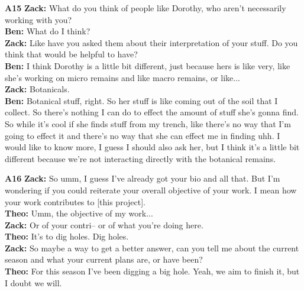 \documentclass{article}
\begin{document}
\noindent\textbf{A15}\label{sec-A15}\newline
\textbf{Zack:} What do you think of people like Dorothy, who aren't
necessarily working with you?\\
\textbf{Ben:} What do I think?\\
\textbf{Zack:} Like have you asked them about their interpretation of
your stuff. Do you think that would be helpful to have?\\
\textbf{Ben:} I think Dorothy is a little bit different, just because
hers is like very, like she's working on micro remains and like macro
remains, or like...\\
\textbf{Zack:} Botanicals.\\
\textbf{Ben:} Botanical stuff, right. So her stuff is like coming out of
the soil that I collect. So there's nothing I can do to effect the
amount of stuff she's gonna find. So while it's cool if she finds stuff
from my trench, like there's no way that I'm going to effect it and
there's no way that she can effect me in finding uhh. I would like to
know more, I guess I should also ask her, but I think it's a little bit
different because we're not interacting directly with the botanical
remains.\newline

\noindent\textbf{A16}\label{sec-A16}\newline
\textbf{Zack:} So umm, I guess I've already got your bio and all that.
But I'm wondering if you could reiterate your overall objective of your
work. I mean how your work contributes to {[}this project{]}.\\
\textbf{Theo:} Umm, the objective of my work...\\
\textbf{Zack:} Or of your contri-- or of what you're doing here.\\
\textbf{Theo:} It's to dig holes. Dig holes.\\
\textbf{Zack:} So maybe a way to get a better answer, can you tell me
about the current season and what your current plans are, or have
been?\\
\textbf{Theo:} For this season I've been digging a big hole. Yeah, we
aim to finish it, but I doubt we will.\newline
\end{document}
